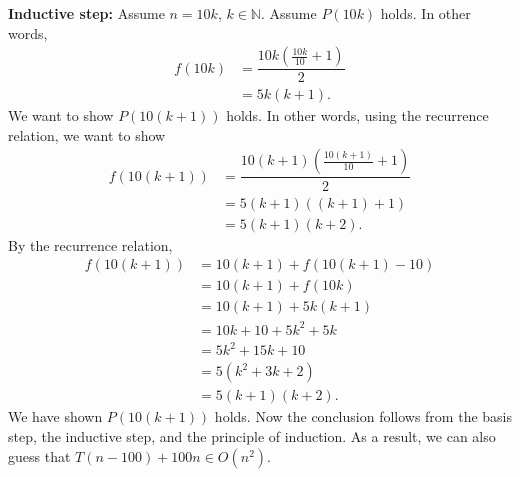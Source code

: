\documentclass[11pt, letterpaper, titlepage]{article}
\begin{document}
\begin{enumerate}[label=\alph*)]
    \textbf{Inductive step:} Assume $n = 10k$, $k \in \mathbb{N}$. Assume $P(10k)$ holds. In other words,
    \begin{align}
        f(10k) &= \dfrac{10k\left( \frac{10k}{10} + 1 \right)}{2} \\
        &= 5k(k + 1).
    \end{align}
    We want to show $P(10(k + 1))$ holds. In other words, using the recurrence relation, we want to show
    \begin{align}
        f(10(k + 1)) &= \dfrac{10(k + 1)\left( \frac{10(k + 1)}{10} + 1 \right)}{2} \\
        &= 5(k + 1)( (k + 1) + 1 ) \\
        &= 5(k + 1)(k + 2).
    \end{align}
    By the recurrence relation,
    \begin{align}
        f(10(k + 1)) &= 10(k + 1) + f(10(k + 1) - 10) \\
        &= 10(k + 1) + f(10k) \\
        &= 10(k + 1) + 5k(k + 1) \\
        &= 10k + 10 + 5k^2 + 5k \\
        &= 5k^2 + 15k + 10 \\
        &= 5(k^2 + 3k + 2) \\
        &= 5(k + 1)(k + 2).
    \end{align}
    We have shown $P(10(k + 1))$ holds. Now the conclusion follows from the basis step, the inductive step, and the principle of induction. As a result, we can also guess that $T(n - 100) + 100n \in O(n^2)$.


\end{enumerate}
\end{document}
